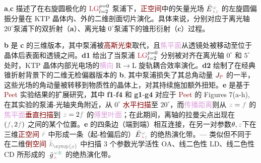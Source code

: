 \textbf{a},\textbf{c} 描述了在\textcolor{NavyBlue}{右旋圆极化}的 $\textcolor{Maroon}{\text{LG}}^{p=0}_{l=2}$ \textcolor{NavyBlue}{泵浦}下，\textcolor{Maroon}{正空间}中的\textcolor{PineGreen}{矢量光场} $\bar{E}^{\;\!\mathcolor{gray}{\omega}}_{\;\! \textcolor{Maroon}{\Yup} \mathcolor{gray}{z}}$ 的\textcolor{NavyBlue}{左旋圆偏振}分量在 KTP 晶体内、外的二维剖面切片演化。具体来说，分别对应于离\textcolor{PineGreen}{光轴} $20^\circ$泵浦下的\textcolor{PineGreen}{双折射}（\textbf{a}）、离\textcolor{PineGreen}{光轴} $0^\circ$泵浦下的\textcolor{PineGreen}{锥形衍射}（\textbf{c}）过程。

\textbf{b} 是 \textbf{c} 的三维版本，其中\textcolor{NavyBlue}{泵浦}被\textcolor{Maroon}{高斯光束}取代，且\textcolor{Plum}{焦平面}从透镜处被移动至位于晶体后表面和透镜之间。\textbf{d1} 给出了当\textcolor{NavyBlue}{泵浦} $\textcolor{Maroon}{\text{LG}}^{p=0}_{l=2}$ 分别被对齐在离\textcolor{PineGreen}{光轴} $0^\circ$ 和 $5^\circ$ 处时，KTP 晶体内部\textcolor{PineGreen}{光电场}的\textcolor{Plum}{横向} R$\to$L \textcolor{NavyBlue}{旋轨耦合}效率演化。\textbf{d2} 绘制了在经典\textcolor{PineGreen}{锥折射}背景下的二维\textcolor{PineGreen}{无检偏器}版本的 \textbf{b}, 其中\textcolor{NavyBlue}{泵浦}损失了其\textcolor{NavyBlue}{总角动量} $J_{\textcolor{Maroon}{\text{P}}}$ 的一半，这些光场的\textcolor{NavyBlue}{角动量}被转移到物质性的晶体上，对其持续施加\textcolor{NavyBlue}{额外扭矩}\cite{berryOrbitalSpinAngular2005}。\textbf{e} 是基于 \textcolor{Maroon}{Peet} 实验结果的扩展研究，其中 \textbf{f1}-\textbf{f4} 和 \textbf{g1}-\textbf{g4} 对应于 \textcolor{Maroon}{Peet} 的 Figures 7(a-h)\cite{peetExperimentalStudyInternal2014}, 在其实验的\textcolor{NavyBlue}{泵浦}-\textcolor{PineGreen}{光轴}夹角附近，从 $0^\circ$ \textcolor{Maroon}{水平扫描}至 $20^\circ$，而\textcolor{Plum}{传播距离}则从 $\mathcolor{gray}{z}=\mathcolor{gray}{f}$ 的\textcolor{Plum}{焦平面}\textcolor{Maroon}{垂直扫描}到 $\mathcolor{gray}{z}=2\mathcolor{gray}{f}$ 的\textcolor{Plum}{傅里叶面}；在此期间，\textcolor{PineGreen}{离轴}的\textcolor{PineGreen}{拉曼尖点}出现在 $(\mathcolor{gray}{f},2\mathcolor{gray}{f})$ 之间的某个位置。\textbf{e} 的四条边（端到端）相互连接，在另一对参数$\theta,\mathcolor{gray}{z}$下在三维\textcolor{Maroon}{正空间} $\mathcolor{gray}{\bar{r}}$ 中形成一条（\textcolor{PineGreen}{起-检偏}后的）$\bar{E}^{\;\!\mathcolor{gray}{\omega}}_{\;\! \textcolor{Maroon}{\Yup} \mathcolor{gray}{z}}$ 的\textcolor{NavyBlue}{绝热演化}带。--- 类似但不同于  在二维\textcolor{Maroon}{倒空间} $\mathcolor{gray}{\bar{k}_{\symup{\rho}}}$ 中扫描 3 个参数\textcolor{NavyBlue}{光学活性 OA}、\textcolor{NavyBlue}{线二色性 LD}、\textcolor{NavyBlue}{线二色性 CD} 所形成的 $\Xint{{}^{}_{\mathcolor{gray}{-}}}{10}{\bar{g}}^{\;\!\mathcolor{gray}{\omega} \textcolor{PineGreen}{\pm}}_{\;\! \textcolor{Maroon}{\Yup}}$ 的\textcolor{NavyBlue}{绝热演化}带。

